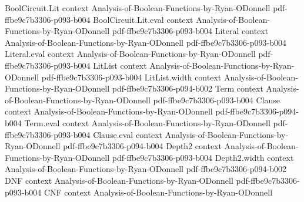 \begin{theorem}
\label{RestrictionFourier.expectation_fourierCoeff_restrictBF}
\leanok
{}
\proofstep
  {BoolCircuit.Lit}
  {context}
  {Analysis-of-Boolean-Functions-by-Ryan-ODonnell}
  {pdf-ffbe9c7b3306-p093-b004}
\proofstep
  {BoolCircuit.Lit.eval}
  {context}
  {Analysis-of-Boolean-Functions-by-Ryan-ODonnell}
  {pdf-ffbe9c7b3306-p093-b004}
\proofstep
  {Literal}
  {context}
  {Analysis-of-Boolean-Functions-by-Ryan-ODonnell}
  {pdf-ffbe9c7b3306-p093-b004}
\proofstep
  {Literal.eval}
  {context}
  {Analysis-of-Boolean-Functions-by-Ryan-ODonnell}
  {pdf-ffbe9c7b3306-p093-b004}
\proofstep
  {LitList}
  {context}
  {Analysis-of-Boolean-Functions-by-Ryan-ODonnell}
  {pdf-ffbe9c7b3306-p093-b004}
\proofstep
  {LitList.width}
  {context}
  {Analysis-of-Boolean-Functions-by-Ryan-ODonnell}
  {pdf-ffbe9c7b3306-p094-b002}
\proofstep
  {Term}
  {context}
  {Analysis-of-Boolean-Functions-by-Ryan-ODonnell}
  {pdf-ffbe9c7b3306-p093-b004}
\proofstep
  {Clause}
  {context}
  {Analysis-of-Boolean-Functions-by-Ryan-ODonnell}
  {pdf-ffbe9c7b3306-p094-b004}
\proofstep
  {Term.eval}
  {context}
  {Analysis-of-Boolean-Functions-by-Ryan-ODonnell}
  {pdf-ffbe9c7b3306-p093-b004}
\proofstep
  {Clause.eval}
  {context}
  {Analysis-of-Boolean-Functions-by-Ryan-ODonnell}
  {pdf-ffbe9c7b3306-p094-b004}
\proofstep
  {Depth2}
  {context}
  {Analysis-of-Boolean-Functions-by-Ryan-ODonnell}
  {pdf-ffbe9c7b3306-p093-b004}
\proofstep
  {Depth2.width}
  {context}
  {Analysis-of-Boolean-Functions-by-Ryan-ODonnell}
  {pdf-ffbe9c7b3306-p094-b002}
\proofstep
  {DNF}
  {context}
  {Analysis-of-Boolean-Functions-by-Ryan-ODonnell}
  {pdf-ffbe9c7b3306-p093-b004}
\proofstep
  {CNF}
  {context}
  {Analysis-of-Boolean-Functions-by-Ryan-ODonnell}

\end{theorem}

